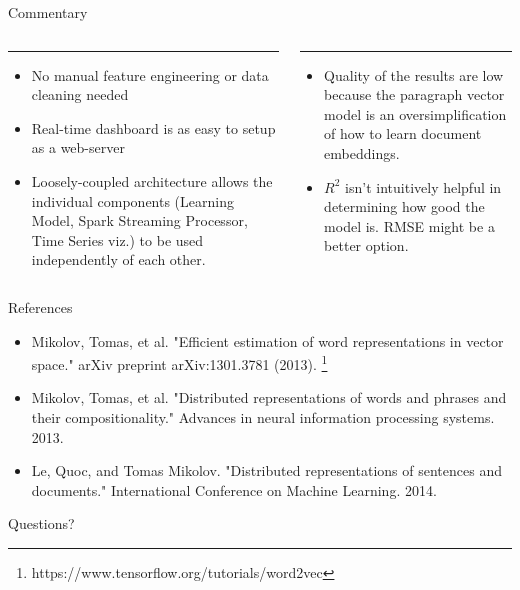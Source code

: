 \documentclass[aspectratio=169]{beamer}
\begin{document}
\begin{frame}{Commentary}
	\begin{columns}[T] %
		\begin{column}{.48\textwidth}
			\color{tropicalrainforest}\rule{\linewidth}{4pt}
			\begin{itemize}
				\item No manual feature engineering or data cleaning needed
				\item Real-time dashboard is as easy to setup as a web-server
				\item Loosely-coupled architecture allows the individual components (Learning Model, Spark Streaming Processor, Time Series viz.) to be used independently of each other.
			\end{itemize}
		\end{column}
		\hfill
		\begin{column}{.48\textwidth}
			\color{usccardinal}\rule{\linewidth}{4pt}
			\begin{itemize}
				\item Quality of the results are low because the paragraph vector model is an oversimplification of how to learn document embeddings.
				\item $R^2$ isn't intuitively helpful in determining how good the model is. RMSE might be a better option.
			\end{itemize}
		\end{column}
	\end{columns}
\end{frame}

\begin{frame}{References}
	\begin{itemize}
		\item Mikolov, Tomas, et al. "Efficient estimation of word representations in vector space." arXiv preprint arXiv:1301.3781 (2013). \footnote{https://www.tensorflow.org/tutorials/word2vec}
		\item Mikolov, Tomas, et al. "Distributed representations of words and phrases and their compositionality." Advances in neural information processing systems. 2013.
		\item Le, Quoc, and Tomas Mikolov. "Distributed representations of sentences and documents." International Conference on Machine Learning. 2014.
	\end{itemize}
\end{frame}

\begin{frame}
	\centering
	\Huge{Questions?}
\end{frame}
\end{document}
